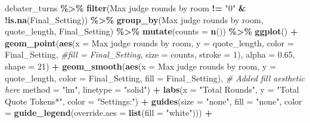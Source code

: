 \documentclass[
]{article}
\newenvironment{Shaded}{\begin{snugshade}}{\end{snugshade}}
\newcommand{\AttributeTok}[1]{\textcolor[rgb]{0.13,0.29,0.53}{#1}}
\newcommand{\CommentTok}[1]{\textcolor[rgb]{0.56,0.35,0.01}{\textit{#1}}}
\newcommand{\DecValTok}[1]{\textcolor[rgb]{0.00,0.00,0.81}{#1}}
\newcommand{\FloatTok}[1]{\textcolor[rgb]{0.00,0.00,0.81}{#1}}
\newcommand{\FunctionTok}[1]{\textcolor[rgb]{0.13,0.29,0.53}{\textbf{#1}}}
\newcommand{\NormalTok}[1]{#1}
\newcommand{\SpecialCharTok}[1]{\textcolor[rgb]{0.81,0.36,0.00}{\textbf{#1}}}
\newcommand{\StringTok}[1]{\textcolor[rgb]{0.31,0.60,0.02}{#1}}
\begin{document}
\begin{Shaded}
\begin{Highlighting}[]
\NormalTok{debater\_turns }\SpecialCharTok{\%\textgreater{}\%}
  \FunctionTok{filter}\NormalTok{(}\StringTok{\textasciigrave{}}\AttributeTok{Max judge rounds by room}\StringTok{\textasciigrave{}} \SpecialCharTok{!=} \StringTok{"0"} \SpecialCharTok{\&} \SpecialCharTok{!}\FunctionTok{is.na}\NormalTok{(Final\_Setting)) }\SpecialCharTok{\%\textgreater{}\%}
  \FunctionTok{group\_by}\NormalTok{(}\StringTok{\textasciigrave{}}\AttributeTok{Max judge rounds by room}\StringTok{\textasciigrave{}}\NormalTok{, quote\_length, Final\_Setting) }\SpecialCharTok{\%\textgreater{}\%}
  \FunctionTok{mutate}\NormalTok{(}\AttributeTok{counts =} \FunctionTok{n}\NormalTok{()) }\SpecialCharTok{\%\textgreater{}\%}
  \FunctionTok{ggplot}\NormalTok{() }\SpecialCharTok{+}
  \FunctionTok{geom\_point}\NormalTok{(}\FunctionTok{aes}\NormalTok{(}\AttributeTok{x =} \StringTok{\textasciigrave{}}\AttributeTok{Max judge rounds by room}\StringTok{\textasciigrave{}}\NormalTok{, }
                 \AttributeTok{y =}\NormalTok{ quote\_length,  }
                 \AttributeTok{color =}\NormalTok{ Final\_Setting,}
                 \CommentTok{\#fill = Final\_Setting,}
                 \AttributeTok{size =}\NormalTok{ counts,}
                 \AttributeTok{stroke =} \DecValTok{1}\NormalTok{),}
             \AttributeTok{alpha =} \FloatTok{0.65}\NormalTok{,}
             \AttributeTok{shape =} \DecValTok{21}\NormalTok{) }\SpecialCharTok{+}
  \FunctionTok{geom\_smooth}\NormalTok{(}\FunctionTok{aes}\NormalTok{(}\AttributeTok{x =} \StringTok{\textasciigrave{}}\AttributeTok{Max judge rounds by room}\StringTok{\textasciigrave{}}\NormalTok{, }
                  \AttributeTok{y =}\NormalTok{ quote\_length, }
                  \AttributeTok{color =}\NormalTok{ Final\_Setting,}
                  \AttributeTok{fill =}\NormalTok{ Final\_Setting),  }\CommentTok{\# Added fill aesthetic here}
              \AttributeTok{method =} \StringTok{"lm"}\NormalTok{, }
              \AttributeTok{linetype =} \StringTok{"solid"}\NormalTok{) }\SpecialCharTok{+}
  \FunctionTok{labs}\NormalTok{(}\AttributeTok{x =} \StringTok{"Total Rounds"}\NormalTok{, }
       \AttributeTok{y =} \StringTok{"Total Quote Tokens*"}\NormalTok{,}
       \AttributeTok{color =} \StringTok{"Settings:"}\NormalTok{) }\SpecialCharTok{+}
  \FunctionTok{guides}\NormalTok{(}\AttributeTok{size =} \StringTok{"none"}\NormalTok{, }\AttributeTok{fill =} \StringTok{"none"}\NormalTok{, }
         \AttributeTok{color =} \FunctionTok{guide\_legend}\NormalTok{(}\AttributeTok{override.aes =} \FunctionTok{list}\NormalTok{(}\AttributeTok{fill =} \StringTok{"white"}\NormalTok{))) }\SpecialCharTok{+}

\end{Highlighting}
\end{Shaded}
\end{document}
